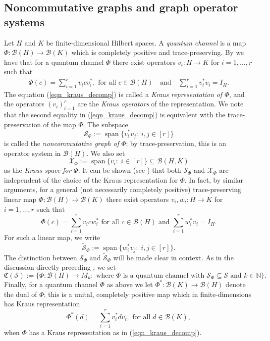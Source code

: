 \documentclass[11pt]{amsart}
\numberwithin{equation}{section}
\theoremstyle{plain}
\theoremstyle{definition}
\theoremstyle{remark}
\newcommand{\B}{{\mathcal{B}}}
\renewcommand{\S}{{\mathcal{S}}}
\newcommand{\X}{{\mathcal{X}}}
\newcommand{\bN}{\mathbb{N}}
\newcommand{\fC}{{\mathfrak{C}}}
\newcommand{\foral}{\text{ for all }}
\newcommand{\qand}{\quad\text{and}\quad}
\newcommand{\wt}{\widetilde}
\newcommand{\spn}{\operatorname{span}}
\begin{document}
\subsection{Noncommutative graphs and graph operator systems}
Let $H$ and $K$ be finite-dimensional Hilbert spaces. A \emph{quantum channel} is a map $\Phi\colon \B(H)\rightarrow \B(K)$ which is completely positive and trace-preserving. By \cite[Theorem 1]{Cho75} we have that for a quantum channel $\Phi$ there exist operators $v_{i}\colon H\rightarrow K$ for $i = 1, \dots, r$ such that 
\begin{gather}\label{eqn_kraus_decomp}
\Phi(c) = \sum\limits_{i=1}^{r}v_{i}cv_{i}^*, \foral c \in \B(H) \qand \sum_{i=1}^{r}v_{i}^*v_{i} = I_{H}.
\end{gather}
The equation (\ref{eqn_kraus_decomp}) is called a \textit{Kraus representation of $\Phi$}, and the operators $(v_{i})_{i=1}^r$  are the \textit{Kraus operators} of the representation. We note that the second equality in (\ref{eqn_kraus_decomp}) is equivalent with the trace-preservation of the map $\Phi$. The subspace
\[
\S_{\Phi} := \spn\{v_{i}^*v_{j}: \; i, j \in [r]\}
\]
is called the \textit{noncommutative graph of} $\Phi$; by trace-preservation, this is an operator system in $\B(H)$.
We also set
\[
\X_{\Phi} := \spn\{v_{i}: \; i \in [r]\} \subseteq \B(H, K)
\]
as the \textit{Kraus space for} $\Phi$. It can be shown (see \cite[Corollary 2.23]{Wat18}) that both $\S_{\Phi}$ and $\X_{\Phi}$ are  independent of the choice of the Kraus representation for $\Phi$.
In fact, by similar arguments, for a general (not necessarily completely positive) trace-preserving linear map $\Phi\colon \B(H)\rightarrow \B(K)$ there exist operators $v_{i}, w_{i}: H\rightarrow K$ for $i = 1, \hdots, r$ such that
\[
\Phi(c) = \sum\limits_{i=1}^{r}v_{i}cw_{i}^{*} \foral c \in \B(H) \text{ and } \sum\limits_{i=1}^{r}w_{i}^{*}v_{i} = I_{H}.
\]
For such a linear map, we write
\[
\wt{\S}_{\Phi} := \spn\{w_{i}^{*}v_{j}: \; i, j \in [r]\}.
\]
The distinction between $\S_{\Phi}$ and $\wt{\S}_{\Phi}$ will be made clear in context. 
As in the discussion directly preceding \cite[Lemma 4.1]{BTW21}, we set
\[
\fC(\S) := \{\Phi\colon \B(H)\rightarrow M_{k}:\text{ where } \Phi \text{ is a quantum channel with } \S_{\Phi} \subseteq \S \text{ and } k \in \bN\}. 
\]
Finally, for a quantum channel $\Phi$ as above we let $\Phi^{*}: \mathcal{B}(K)\rightarrow \mathcal{B}(H)$ denote the dual of $\Phi$; this is a unital, completely positive map which in finite-dimensions has Kraus representation
\[
\Phi^{*}(d) = \sum\limits_{i=1}^{r}v_{i}^{*}dv_{i}, \foral d \in \mathcal{B}(K),
\]
when $\Phi$ has a Kraus representation as in (\ref{eqn_kraus_decomp}).
\end{document}
